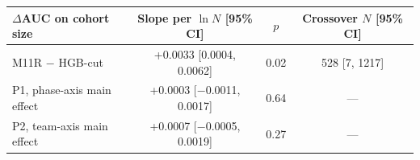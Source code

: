 \begin{tabular}{@{}l c c c@{}}
\toprule
$\Delta$AUC on cohort size & Slope per $\ln N$ [95\% CI] & $p$ & Crossover $N$ [95\% CI] \\
\midrule
M11R $-$ HGB-cut & +0.0033 [0.0004, 0.0062] & 0.02 & 528 [7, 1217] \\
P1, phase-axis main effect & +0.0003 [$-$0.0011, 0.0017] & 0.64 & --- \\
P2, team-axis main effect & +0.0007 [$-$0.0005, 0.0019] & 0.27 & --- \\
\bottomrule
\end{tabular}
